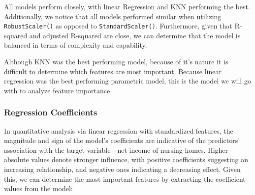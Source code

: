 \documentclass{article}
\theoremstyle{mytheoremstyle}
\theoremstyle{mytheoremstyle}
\theoremstyle{myproblemstyle}
\begin{document}
\FloatBarrier %

All models perform closely, with linear Regression and KNN performing the best. Additionally, we notice that all models performed similar when utilizing \texttt{RobustScaler()} as opposed to \texttt{StandardScaler()}. Furthermore, given that R-squared and adjusted R-squared are close, we can determine that the model is balanced in terms of complexity and capability. 

Although KNN was the best performing model, because of it's nature it is difficult to determine which features are most important. Because linear regression was the best performing parametric model, this is the model we will go with to analyze feature importance. 

\subsubsection{Regression Coefficients}

In quantitative analysis via linear regression with standardized features, the magnitude and sign of the model's coefficients are indicative of the predictors' association with the target variable—net income of nursing homes. Higher absolute values denote stronger influence, with positive coefficients suggesting an increasing relationship, and negative ones indicating a decreasing effect. Given this, we can determine the most important features by extracting the coefficient values from the model:
\end{document}
